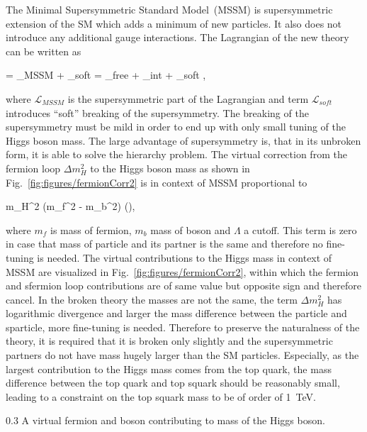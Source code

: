 The Minimal Supersymmetric Standard Model~(MSSM) is supersymmetric extension of the SM which adds a minimum of new particles. It also does not introduce any additional gauge interactions. The Lagrangian of the new theory can be written as

{
     =  _{MSSM} +  _{soft} = _{free} + _{int} + _{soft}    ,
}

where $\mathcal{L}_{MSSM}$ is the supersymmetric part of the Lagrangian and term $\mathcal{L}_{soft}$ introduces ``soft'' breaking of the supersymmetry. The breaking of the supersymmetry must be mild in order to end up with only small tuning of the Higgs boson mass. The large advantage of supersymmetry is, that in its unbroken form, it is able to solve the hierarchy problem. The virtual correction from the fermion loop $\Delta m_{H}^{2}$ to the Higgs boson mass as shown in Fig.~\ref{fig:figures/fermionCorr2} is  in context of MSSM proportional to

{
\Delta m_{H}^{2} \propto (m_{f}^{2} - m_{b}^2)  \left(\right),
}

where $m_{f}$ is mass of fermion, $m_{b}$ mass of boson and $\Lambda$ a cutoff. This term is zero in case that mass of particle and its partner is the same and therefore no fine-tuning is needed. The virtual contributions to the Higgs mass in context of MSSM are visualized in Fig.~\ref{fig:figures/fermionCorr2}, within which the fermion and sfermion loop contributions are of same value but opposite sign and therefore cancel. In the broken theory the masses are not the same, the term $\Delta m_{H}^{2}$ has logarithmic divergence and larger the mass difference between the particle and sparticle, more fine-tuning is needed. Therefore to preserve the naturalness of the theory, it is required that it is broken only slightly and the supersymmetric partners do not have mass hugely larger than the SM particles. Especially, as the largest  contribution to the Higgs mass comes from the top quark, the mass difference between the top quark and top squark should be reasonably small, leading to a constraint on the top squark mass to be of order of 1~TeV.

                 {0.3}       %
                 { A virtual fermion and boson contributing to mass of the Higgs boson.}


